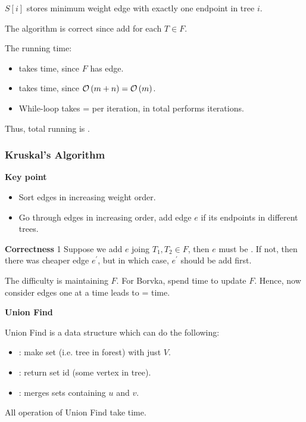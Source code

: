 $S[i]$ stores minimum weight edge with exactly one endpoint in tree $i$.

\analysis

The algorithm is correct since add 
for each $T \in F$.

The running time:
\begin{itemize}
    \item {} takes  time,
        since $F$ has  edge.
    \item {} takes  time,
        since $\mathcal{O}\left(m + n\right) = \mathcal{O}\left(m\right)$.
    \item While-loop takes  =  per iteration,
        in total performs  iterations.
\end{itemize}
Thus, total running is .

\subsubsection{Kruskal's Algorithm}

\vspace{0.1in}\noindent\textbf{Key point}
\begin{itemize}
    \item Sort edges in increasing weight order.
    \item Go through edges in increasing order,
        add edge $e$ if its endpoints in different trees.
\end{itemize}

\vspace{0.1in}\noindent\textbf{Correctness}
1
Suppose we add $e$ joing $T_1,T_2 \in F$,
then $e$ must be .
If not, then there was cheaper edge $e^\prime$,
but in which case, $e^\prime$ should be add first.

The difficulty is maintaining $F$.
For Borvka, spend  time to update $F$.
Hence, now consider edges one at a time leads to
 =  time.

\vspace{0.1in}\noindent\textbf{Union Find}

Union Find is a data structure which can do the following:
\begin{itemize}
    \item {}: make set (i.e. tree in forest)
        with just $V$.
    \item {}: return set id (some vertex in tree).
    \item {}: merges sets containing $u$ and $v$.
\end{itemize}
All operation of Union Find take  time.


